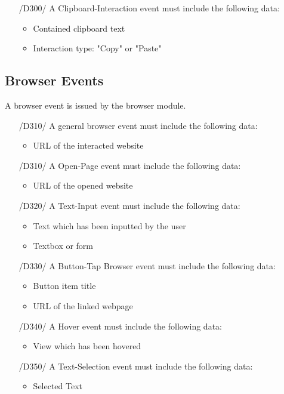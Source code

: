 \begin{itemize}
\item[/D300/] A Clipboard-Interaction event must include the following data:
	\begin{itemize}
	\item Contained clipboard text
	\item Interaction type: "Copy" or "Paste"
	\end{itemize}
\end{itemize}

\subsection{Browser Events}

A browser event is issued by the browser module.

\begin{itemize}
\item[/D310/] A general browser event must include the following data:
	\begin{itemize}
	\item URL of the interacted website
	\end{itemize}

\item[/D310/] A Open-Page event must include the following data:
	\begin{itemize}
	\item URL of the opened website
	\end{itemize}
	
\item[/D320/] A Text-Input event must include the following data:
	\begin{itemize}
	\item Text which has been inputted by the user
	\item Textbox or form
	\end{itemize}
	
\item[/D330/] A Button-Tap Browser event must include the following data:
	\begin{itemize}
	\item Button item title
	\item URL of the linked webpage
	\end{itemize}
	
\item[/D340/] A Hover event must include the following data:
	\begin{itemize}
	\item View which has been hovered
	\end{itemize}
	
\item[/D350/] A Text-Selection event must include the following data:
	\begin{itemize}
	\item Selected Text
	\end{itemize}
\end{itemize}